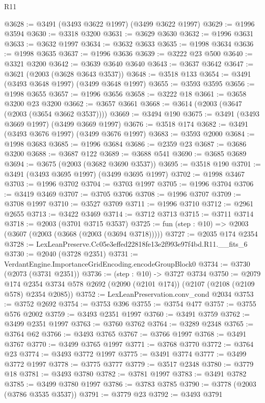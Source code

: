 \begin{lexlean}{R11}
\begin{coremodule}
@3628 := @3491 (@3493 @3622 @1997) (@3499 @3622 @1997)
@3629 := @1996 @3594
@3630 := @3318 @3200
@3631 := @3629 @3630
@3632 := @1996 @3631
@3633 := @3632 @1997
@3634 := @3632 @3633
@3635 := @1998 @3634
@3636 := @1998 @3635
@3637 := @1996 @3636
@3639 := @3222 @23 @500
@3640 := @3321 @3200
@3642 := @3639 @3640 @3640
@3643 := @3637 @3642
@3647 := @3621 (@2003 (@3628 @3643 @3537))
@3648 := @3518 @133
@3654 := @3491 (@3493 @3648 @1997) (@3499 @3648 @1997)
@3655 := @3593 @3595
@3656 := @1998 @3655
@3657 := @1996 @3656
@3658 := @3222 @18
@3661 := @3658 @3200 @23 @3200
@3662 := @3657 @3661
@3668 := @3614 (@2003 (@3647 (@2003 (@3654 @3662 @3537))))
@3669 := @3494 @190
@3675 := @3491 (@3493 @3669 @1997) (@3499 @3669 @1997)
@3676 := @3518 @174
@3682 := @3491 (@3493 @3676 @1997) (@3499 @3676 @1997)
@3683 := @3593 @2000
@3684 := @1998 @3683
@3685 := @1996 @3684
@3686 := @2359 @23
@3687 := @3686 @3200
@3688 := @3687 @122
@3689 := @3688 @541
@3690 := @3685 @3689
@3694 := @3675 (@2003 (@3682 @3690 @3537))
@3695 := @3518 @190
@3701 := @3491 (@3493 @3695 @1997) (@3499 @3695 @1997)
@3702 := @1998 @3467
@3703 := @1996 @3702
@3704 := @3703 @1997
@3705 := @1996 @3704
@3706 := @3419 @3469
@3707 := @3705 @3706
@3708 := @1996 @3707
@3709 := @3708 @1997
@3710 := @3527 @3709
@3711 := @1996 @3710
@3712 := @2961 @2655
@3713 := @3422 @3469
@3714 := @3712 @3713
@3715 := @3711 @3714
@3718 := @2003 (@3701 @3715 @3537)
@3725 := fun (step : @10) => @2003 (@3607 (@2003 (@3668 (@2003 (@3694 @3718)))))
@3727 := @2035 @174 @2354
@3728 := LexLeanPreserve.Cc05e3effed22818fe13e2f993e97f4bd.R11.__fits_6
@3730 := @2040 (@3728 @2351)
@3731 := VerdantEngine.ImportanceGridEncoding.encodeGroupBlock0
@3734 := @3730 (@2073 (@3731 @2351))
@3736 := (step : @10) -> @3727 @3734
@3750 := @2079
    @174
    @2354
    @3734
    @578
    @2692
    (@2090 (@2101 @174))
    (@2107 (@2108 (@2109 @578) @2354 @2085))
@3752 := LexLeanPreservation.conv_cond @2034
@3753 := @3752 @2692
@3754 := @3753 @396
@3755 := @3754 @477
@3757 := @3755 @576 @2002
@3759 := @3493 @2351 @1997
@3760 := @3491 @3759
@3762 := @3499 @2351 @1997
@3763 := @3760 @3762
@3764 := @3289 @2348
@3765 := @3764 @62
@3766 := @3493 @3765
@3767 := @3766 @1997
@3768 := @3491 @3767
@3770 := @3499 @3765 @1997
@3771 := @3768 @3770
@3772 := @3764 @23
@3774 := @3493 @3772 @1997
@3775 := @3491 @3774
@3777 := @3499 @3772 @1997
@3778 := @3775 @3777
@3779 := @3517 @2348
@3780 := @3779 @18
@3781 := @3493 @3780
@3782 := @3781 @1997
@3783 := @3491 @3782
@3785 := @3499 @3780 @1997
@3786 := @3783 @3785
@3790 := @3778 (@2003 (@3786 @3535 @3537))
@3791 := @3779 @23
@3792 := @3493 @3791

\end{coremodule}
\end{lexlean}
